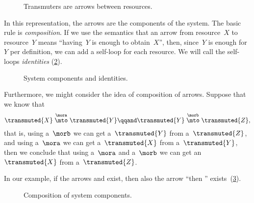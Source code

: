 
\begin{figure}[h!]
	\centering
	\caption{Transmuters are arrows between resources.}
	\label{fig:e2}
\end{figure}

In this representation, the arrows are the components of the system.
The basic rule is \emph{composition}.
If we use the semantics that an arrow from resource~$X$ to resource~$Y$ means ``having~$Y$ is enough to obtain~$X$'', then, since~$Y$ is enough for~$Y$ per definition, we can add a self-loop for each resource.
We will call the self-loops \emph{identities} (\cref{fig:e3}).

\begin{figure}[h!]
	\centering
	\caption{System components and identities. }
	\label{fig:e3}
\end{figure}


Furthermore, we might consider the idea of composition of arrows.
Suppose that we know that
%
\begin{equation*}
	\transmuted{X} \stackrel{\mora}{\mto} \transmuted{Y}
	\qqand
	\transmuted{Y} \stackrel{\morb}{\mto} \transmuted{Z},
\end{equation*}
%
that is, using a~$\morb$ we can get a~$\transmuted{Y}$ from a~$\transmuted{Z}$, and using a~$\mora$ we can get a~$\transmuted{X}$ from a~$\transmuted{Y}$, then we conclude that using a~$\mora$ and a~$\morb$ we can get an~$\transmuted{X}$ from a~$\transmuted{Z}$.

In our example, if the arrows \wheels  and \motor exist, then also the arrow ``\wheels then \motor'' exists~(\cref{fig:e4}).

\begin{figure}[h!]
	\centering
	\caption{Composition of system components. }
	\label{fig:e4}
\end{figure}

